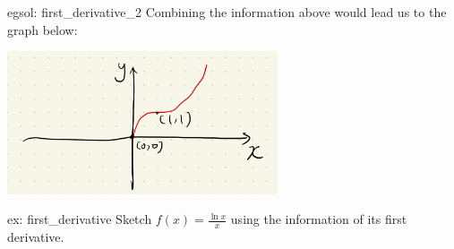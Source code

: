 \begin{egsol}[]{egsol: first_derivative_2}
    Combining the information above would lead us to the graph below:
    \begin{center}
        \includegraphics[width = 0.6\textwidth]{figures/chap 05/eg_first_derivative_2.png}
        \label{fig: eg_first_derivative_2}
    \end{center}
\end{egsol}

\begin{ex}[]{ex: first_derivative}
    Sketch $f(x)=\frac{\ln x}{x}$ using the information of its first derivative.
\end{ex}

